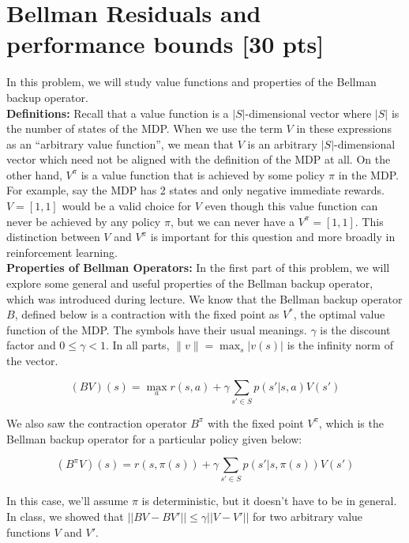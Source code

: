 \section{Bellman Residuals and performance bounds [30 pts]}

In this problem, we will study value functions and properties of the Bellman backup operator.
\\

\noindent \textbf{Definitions:} \noindent Recall that a value function is a $|S|$-dimensional vector where $|S|$ is the number of states of the MDP. When we use the term $V$ in these expressions as an ``arbitrary value function'', we mean that $V$ is an arbitrary $|S|$-dimensional vector which need not be aligned with the definition of the MDP at all. 
On the other hand, $V^\pi$ is a value function that is achieved by some policy $\pi$ in the MDP.
For example, say the MDP has 2 states and only negative immediate rewards. $V = [1,1]$ would be a valid choice for $V$ even though this value function can never be achieved by any policy $\pi$, but we can never have a $V^\pi = [1,1]$. This distinction between $V$ and $V^\pi$ is important for this question and more broadly in reinforcement learning.
\\


\noindent \textbf{Properties of Bellman Operators:} In the first part of this problem, we will explore some general and useful properties of the Bellman backup operator, which was introduced during lecture. We know that the Bellman backup operator $B$, defined below is a contraction with the fixed point as $V^*$, the optimal value function of the MDP. The symbols have their usual meanings. $\gamma$ is the discount factor and $0 \leq \gamma < 1$. In all parts, $\|v\| = \max_{s} | v(s) |$ is the infinity norm of the vector.

\begin{equation}
    (BV)(s) = \max_a r(s, a) + \gamma\sum_{s' \in S}p(s'|s,a)V(s')
\end{equation}

\noindent We also saw the contraction operator $B^\pi$ with the fixed point $V^\pi$, which is the Bellman backup operator for a particular policy given below:

\begin{equation}
    (B^\pi V)(s) = r(s,\pi(s)) + \gamma\sum_{s' \in S}p(s'|s,\pi(s))V(s')
\end{equation}


\noindent In this case, we'll assume $\pi$ is deterministic, but it doesn't have to be in general. In class, we showed that $|| BV - BV' || \leq \gamma ||V - V'||$ for two arbitrary value functions $V$ and $V'$. 

